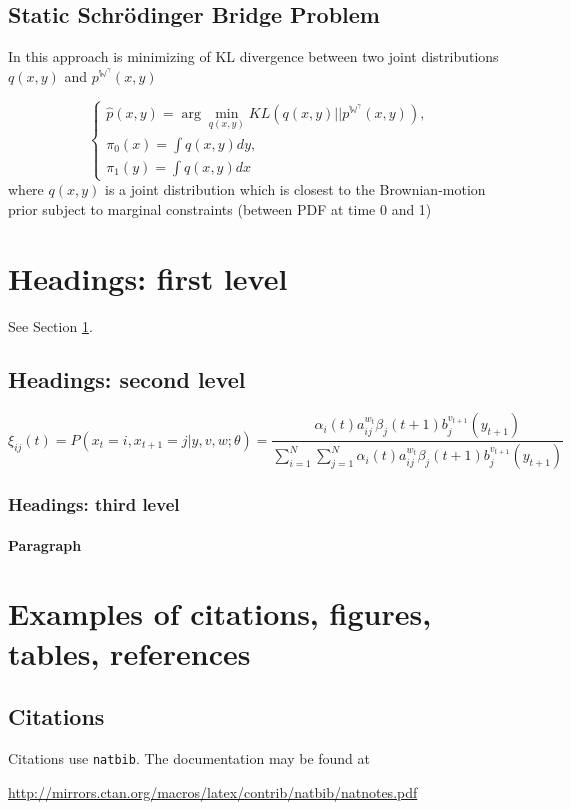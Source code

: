 \documentclass{article}
\begin{document}
\subsection{Static Schrödinger Bridge Problem}
In this approach is minimizing of KL divergence between two joint distributions $q(x,y)$ and $p^{\mathbb{W}^\gamma}(x,y)$

$$\left\{ \begin{array}{c}
\hat p(x,y) = \arg\min_{q(x,y)} KL(q(x,y)||p^{\mathbb{W}^\gamma}(x,y)), \\
\pi_0(x) = \int q(x,y)dy, \\
\pi_1(y) = \int q(x,y)dx
\end{array}\right.$$
where $q(x,y)$ is a joint distribution which is closest to the Brownian-motion prior subject to marginal constraints (between PDF at time 0 and 1)
\section{Headings: first level}
\label{sec:headings}

\lipsum[4] See Section \ref{sec:headings}.

\subsection{Headings: second level}
\lipsum[5]
\begin{equation}
	\xi _{ij}(t)=P(x_{t}=i,x_{t+1}=j|y,v,w;\theta)= {\frac {\alpha _{i}(t)a^{w_t}_{ij}\beta _{j}(t+1)b^{v_{t+1}}_{j}(y_{t+1})}{\sum _{i=1}^{N} \sum _{j=1}^{N} \alpha _{i}(t)a^{w_t}_{ij}\beta _{j}(t+1)b^{v_{t+1}}_{j}(y_{t+1})}}
\end{equation}

\subsubsection{Headings: third level}
\lipsum[6]

\paragraph{Paragraph}
\lipsum[7]



\section{Examples of citations, figures, tables, references}
\label{sec:others}

\subsection{Citations}
Citations use \verb+natbib+. The documentation may be found at
\begin{center}
	\url{http://mirrors.ctan.org/macros/latex/contrib/natbib/natnotes.pdf}
\end{center}
\end{document}
